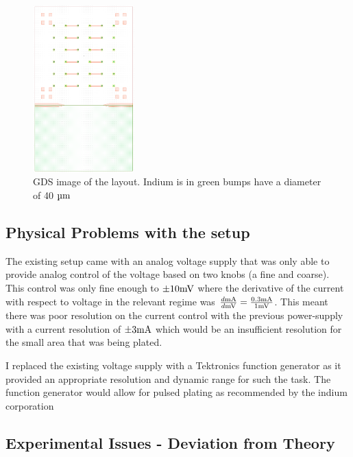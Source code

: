 \begin{figure}
    \centering
    \includegraphics[width=0.35\textwidth]{Main/Ch1/GDS_V1.png}
    \caption{GDS image of the layout. Indium is in green bumps have a diameter of 40 $\um$}
    \label{fig:gds_ch1}
    \vspace{.2cm}
\end{figure}


\subsection{Physical Problems with the setup}

The existing setup came with an analog voltage supply that was only able to provide analog control of the voltage based on two knobs (a fine and coarse). This control was only fine enough to $\pm 10 \mV$ where the derivative of the current with respect to voltage in the relevant regime was $\frac{d \mA}{d \mV} = \frac{0.3 \mA}{1 \mV}$.
This meant there was poor resolution on the current control with the previous power-supply with a current resolution of $\pm 3 \mA$ which would be an insufficient resolution for the small area that was being plated.

I replaced the existing voltage supply with a Tektronics function generator as it provided an appropriate resolution and dynamic range for such the task.
The function generator would allow for pulsed plating as recommended by the indium corporation \cite{indiumCorpGrainStructure}

\newpage
\subsection{Experimental Issues - Deviation from Theory}

